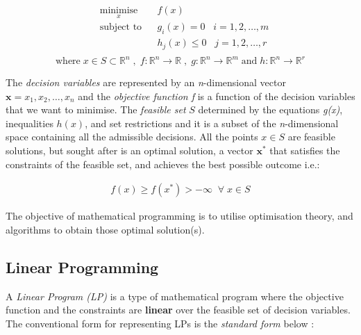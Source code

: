 \begin{equation}
\begin{aligned}
& \underset{x}{\text{minimise}}
& & f(x) \\
& \text{subject to}
& & g_i(x) = 0 \;\;\; i = 1,2, \ldots, m\\
& & & h_j(x) \leq 0 \;\;\; j = 1,2, \ldots, r\\
\end{aligned}
\end{equation}
\[\text{where} \; x \in S \subset \mathbb{R}^{n} \; , \; f:\mathbb{R}^{n}\rightarrow \mathbb{R} \; , \; g:\mathbb{R}^{n}\rightarrow \mathbb{R}^{m} \; \text{and} \; h:\mathbb{R}^{n}\rightarrow \mathbb{R}^{r} \]

\vspace{\baselineskip}
\noindent
The \textit{decision variables} are represented by an \textit{n}-dimensional vector  \( \pmb{x}=x_{1},x_{2}, \ldots ,x_{n} \) and the \textit{objective function f} is a function of the decision variables that we want to minimise. The \textit{feasible set}  \( S\) determined by the equations \textit{g(x)}, inequalities \textit{$h(x)$}, and set restrictions and it is a subset of the \textit{n}-dimensional space containing all the admissible decisions. All the points $x \in S$ are feasible solutions, but sought after is an optimal solution, a vector $\pmb{x^\ast}$ that satisfies the constraints of the feasible set, and achieves the best possible outcome i.e.: \par

\begin{equation*}
\begin{aligned}
f(x)\geq f(x^\ast) > -\infty \;\; \forall \; x\in S
\end{aligned}
\end{equation*}

\vspace{\baselineskip}
\noindent
The objective of mathematical programming is to utilise optimisation theory, and algorithms to obtain those optimal solution(s).



\subsection{Linear Programming}
\label{section: LP}
A\textit{ Linear Program (LP) }is a type of mathematical program where the\textbf{ }objective function and the constraints are \textbf{linear} over the feasible set of decision variables. The conventional form for representing LPs is the \textit{standard form} below \cite{DUMMY:1}:\par

